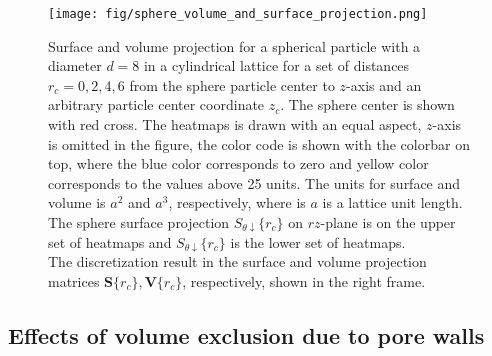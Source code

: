 \documentclass[10pt, a4paper]{article}
\begin{document}
\begin{figure}[H]
    \centering
    \texttt{[image: fig/sphere\_volume\_and\_surface\_projection.png]}
    \caption{
        Surface and volume projection for a spherical particle with a diameter $d=8$ in a cylindrical lattice for a set of distances $r_c = {0, 2, 4, 6}$ from the sphere particle center to $z$-axis and an arbitrary particle center coordinate $z_c$.
        The sphere center is shown with red cross.
        The heatmaps is drawn with an equal aspect, $z$-axis is omitted in the figure, the color code is shown with the colorbar on top, where the blue color corresponds to zero and yellow color corresponds to the values above 25 units.
        The units for surface and volume is $a^2$ and $a^3$, respectively, where is $a$ is a lattice unit length.
        The sphere surface projection $S_{\theta \downarrow}\{r_c\}$ on $rz$-plane is on the upper set of heatmaps and $S_{\theta \downarrow}\{r_c\}$ is the lower set of heatmaps.
        \\
        The discretization result in the surface and volume projection matrices $\bm{S}\{r_c\}, \bm{V}\{r_c\}$, respectively, shown in the right frame.
    }
    \label{fig:sphere_volume_and_surface_projection}
\end{figure}


\subsection*{Effects of volume exclusion due to pore walls}
\end{document}
